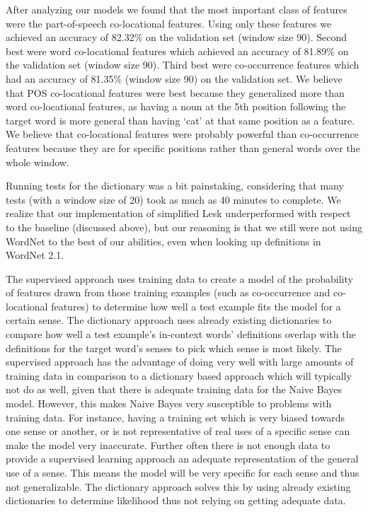 \documentclass{article}
\begin{document}
After analyzing our models we found that the most important class of features were the part-of-speech co-locational features. Using only these features we achieved an accuracy of 82.32\% on the validation set (window size 90). Second best were word co-locational features which achieved an accuracy of 81.89\% on the validation set (window size 90). Third best were co-occurrence features which had an accuracy of 81.35\% (window size 90) on the validation set. We believe that POS co-locational features were best because they generalized more than word co-locational features, as having a noun at the 5th position following the target word is more general than having `cat' at that same position as a feature. We believe that co-locational features were probably powerful than co-occurrence features because they are for specific positions rather than general words over the whole window.

Running tests for the dictionary was a bit painstaking, considering that many tests (with a window size of 20) took as much as 40 minutes to complete. We realize that our implementation of simplified Lesk underperformed with respect to the baseline (discussed above), but our reasoning is that we still were not using WordNet to the best of our abilities, even when looking up definitions in WordNet 2.1.

The supervised approach uses training data to create a model of the probability of features drawn from those training examples (such as co-occurrence and co-locational features) to determine how well a test example fits the model for a certain sense. The dictionary approach uses already existing dictionaries to compare how well a test example's in-context words' definitions overlap with the definitions for the target word's senses to pick which sense is most likely. The supervised approach has the advantage of doing very well with large amounts of training data in comparison to a dictionary based approach which will typically not do as well, given that there is adequate training data for the Naive Bayes model. However, this makes Naive Bayes very susceptible to problems with training data. For instance, having a training set which is very biased towards one sense or another, or is not representative of real uses of a specific sense can make the model very inaccurate. Further often there is not enough data to provide a supervised learning approach an adequate representation of the general use of a sense. This means the model will be very specific for each sense and thus not generalizable. The dictionary approach solves this by using already existing dictionaries to determine likelihood thus not relying on getting adequate data.
\end{document}
